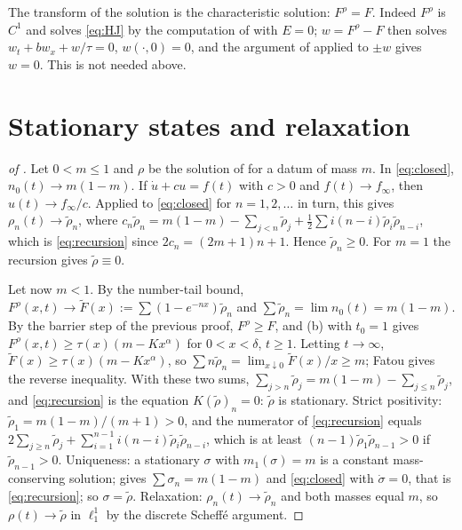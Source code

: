 \documentclass[11pt,a4paper]{report}
\newcommand{\rtil}{\tilde\rho}
\begin{document}
\begin{remark}
The transform of the solution is the characteristic solution: \(F^\rho=F\). Indeed \(F^\rho\) is \(C^1\) and
solves \eqref{eq:HJ} by the computation of  with \(E=0\); \(w=F^\rho-F\) then solves
\(w_t+bw_x+w/\tau=0\), \(w(\cdot,0)=0\), and the argument of  applied to \(\pm w\) gives
\(w=0\). This is not needed above.
\end{remark}

\section{Stationary states and relaxation}\label{sec:stationary}

\begin{proof}[of ]
Let \(0<m\le1\) and \(\rho\) be the solution of  for a datum of mass \(m\). In
\eqref{eq:closed}, \(n_0(t)\to m(1-m)\). If \(\dot u+cu=f(t)\) with \(c>0\) and \(f(t)\to f_\infty\), then
\(u(t)\to f_\infty/c\). Applied to \eqref{eq:closed} for \(n=1,2,\dots\) in turn, this gives
\(\rho_n(t)\to\rtil_n\), where \(c_n\rtil_n=m(1-m)-\sum_{j<n}\rtil_j+\frac12\sum i(n-i)\rtil_i\rtil_{n-i}\), which is
\eqref{eq:recursion} since \(2c_n=(2m+1)n+1\). Hence \(\rtil_n\ge0\). For \(m=1\) the recursion gives
\(\rtil\equiv0\).

Let now \(m<1\). By the number-tail bound, \(F^\rho(x,t)\to\tilde F(x):=\sum(1-e^{-nx})\rtil_n\) and
\(\sum\rtil_n=\lim n_0(t)=m(1-m)\). By the barrier step of the previous proof, \(F^\rho\ge F\), and
(b) with \(t_0=1\) gives \(F^\rho(x,t)\ge\tau(x)(m-Kx^\alpha)\) for \(0<x<\delta\),
\(t\ge1\). Letting \(t\to\infty\), \(\tilde F(x)\ge\tau(x)(m-Kx^\alpha)\), so
\(\sum n\rtil_n=\lim_{x\downarrow0}\tilde F(x)/x\ge m\); Fatou gives the reverse inequality.
With these two sums, \(\sum_{j>n}\rtil_j=m(1-m)-\sum_{j\le n}\rtil_j\), and \eqref{eq:recursion} is the equation
\(K(\rtil)_n=0\): \(\rtil\) is stationary. Strict positivity: \(\rtil_1=m(1-m)/(m+1)>0\), and the numerator of
\eqref{eq:recursion} equals \(2\sum_{j\ge n}\rtil_j+\sum_{i=1}^{n-1}i(n-i)\rtil_i\rtil_{n-i}\), which is at least
\((n-1)\rtil_1\rtil_{n-1}>0\) if \(\rtil_{n-1}>0\). Uniqueness: a stationary \(\sigma\) with \(m_1(\sigma)=m\) is a
constant mass-conserving solution;  gives \(\sum\sigma_n=m(1-m)\) and \eqref{eq:closed} with
\(\dot\sigma=0\), that is \eqref{eq:recursion}; so \(\sigma=\rtil\). Relaxation: \(\rho_n(t)\to\rtil_n\) and both
masses equal \(m\), so \(\rho(t)\to\rtil\) in \(\ell^1_1\) by the discrete Scheffé argument.
\end{proof}
\end{document}
